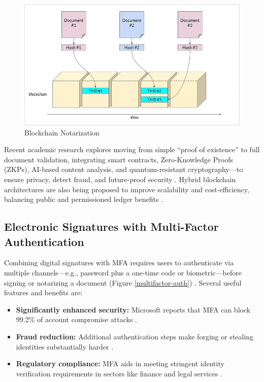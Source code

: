 \begin{figure}[H]
    \centering
    \includegraphics[width=18cm]{"images/blockchain-notarization.png"}
    \caption{Blockchain Notarization}
    \label{blockchain-notarization}
\end{figure}

Recent academic research explores moving from simple “proof of existence” to full document validation, integrating smart contracts, Zero-Knowledge Proofs (ZKPs), AI-based content analysis, and quantum-resistant cryptography—to ensure privacy, detect fraud, and future-proof security \cite{tejas_chandrakant_mhapankar_future_nodate}. Hybrid blockchain architectures are also being proposed to improve scalability and cost-efficiency, balancing public and permissioned ledger benefits \cite{domenico_tortola_scalable_nodate}.

\subsection{Electronic Signatures with Multi-Factor Authentication}
Combining digital signatures with MFA requires users to authenticate via multiple channels—e.g., password plus a one-time code or biometric—before signing or notarizing a document (Figure \ref{multifactor-auth}) \cite{sutisoft_role_nodate}. Several useful features and benefits are:

\begin{itemize}
    \item \textbf{Significantly enhanced security:} Microsoft reports that MFA can block 99.2\% of account compromise attacks \cite{pingidentity_eight_nodate}.
    \item \textbf{Fraud reduction:} Additional authentication steps make forging or stealing identities substantially harder \cite{sutisoft_role_nodate,uplevel_systems_top_nodate}.
    \item \textbf{Regulatory compliance:} MFA aids in meeting stringent identity verification requirements in sectors like finance and legal services \cite{sutisoft_role_nodate}.
\end{itemize}

